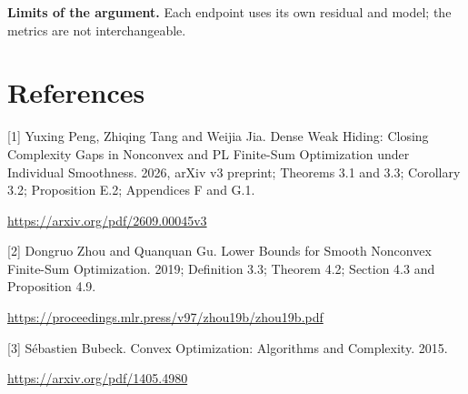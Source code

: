 \documentclass[10pt,a4paper]{article}
\begin{document}
\textbf{Limits of the argument.} Each endpoint uses its own residual and model; the metrics are not interchangeable.

\section{References}
[1] Yuxing Peng, Zhiqing Tang and Weijia Jia. Dense Weak Hiding: Closing Complexity Gaps in Nonconvex and PL Finite-Sum Optimization under Individual Smoothness. 2026, arXiv v3 preprint; Theorems 3.1 and 3.3; Corollary 3.2; Proposition E.2; Appendices F and G.1.

\url{https://arxiv.org/pdf/2609.00045v3}

[2] Dongruo Zhou and Quanquan Gu. Lower Bounds for Smooth Nonconvex Finite-Sum Optimization. 2019; Definition 3.3; Theorem 4.2; Section 4.3 and Proposition 4.9.

\url{https://proceedings.mlr.press/v97/zhou19b/zhou19b.pdf}

[3] Sébastien Bubeck. Convex Optimization: Algorithms and Complexity. 2015.

\url{https://arxiv.org/pdf/1405.4980}
\end{document}
